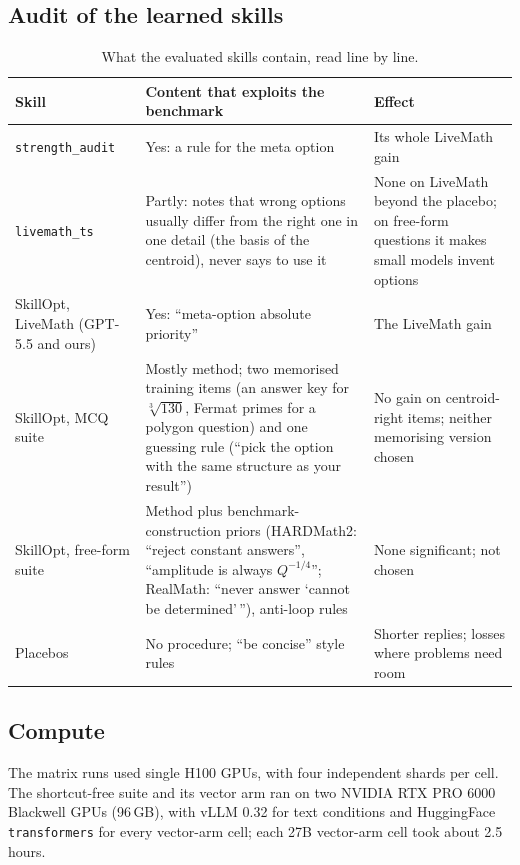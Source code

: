 \documentclass[11pt]{article}
\begin{document}
\subsection{Audit of the learned skills}
\label{app:audit}

\begin{table}[t]
\centering\small
\begin{tabular}{@{}p{}p{}p{}@{}}
\toprule
Skill & Content that exploits the benchmark & Effect \\
\midrule
\texttt{strength\_audit} & Yes: a rule for the meta option & Its whole LiveMath gain \\
\texttt{livemath\_ts} & Partly: notes that wrong options usually differ from the right one in one
detail (the basis of the centroid), never says to use it & None on LiveMath beyond the placebo; on
free-form questions it makes small models invent options \\
SkillOpt, LiveMath (GPT-5.5 and ours) & Yes: ``meta-option absolute priority'' & The LiveMath gain \\
SkillOpt, MCQ suite & Mostly method; two memorised training items (an answer key for $\sqrt[3]{130}$,
Fermat primes for a polygon question) and one guessing rule (``pick the option with the same
structure as your result'') & No gain on centroid-right items; neither memorising version chosen \\
SkillOpt, free-form suite & Method plus benchmark-construction priors (HARDMath2: ``reject constant
answers'', ``amplitude is always $Q^{-1/4}$''; RealMath: ``never answer `cannot be determined'\,''),
anti-loop rules & None significant; not chosen \\
Placebos & No procedure; ``be concise'' style rules & Shorter replies; losses where problems need room \\
\bottomrule
\end{tabular}
\caption{What the evaluated skills contain, read line by line.}
\label{tab:audit}
\end{table}

\subsection{Compute}

The matrix runs used single H100 GPUs, with four independent shards per cell. The shortcut-free
suite and its vector arm ran on two NVIDIA RTX PRO 6000 Blackwell GPUs (96\,GB), with vLLM 0.32 for
text conditions and HuggingFace \texttt{transformers} for every vector-arm cell; each 27B vector-arm
cell took about 2.5 hours. 
\end{document}
